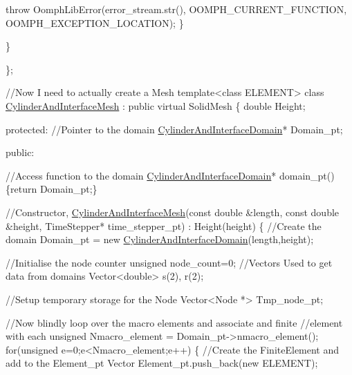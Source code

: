 \begin{DoxyCodeInclude}
      \textcolor{keywordflow}{throw} OomphLibError(error\_stream.str(),
                          OOMPH\_CURRENT\_FUNCTION,
                          OOMPH\_EXCEPTION\_LOCATION);
   \}

 \}

\};

\textcolor{comment}{//Now I need to actually create a Mesh}
\textcolor{keyword}{template}<\textcolor{keyword}{class} ELEMENT>
\textcolor{keyword}{class }\hyperlink{classCylinderAndInterfaceMesh}{CylinderAndInterfaceMesh} : \textcolor{keyword}{public} \textcolor{keyword}{virtual} SolidMesh
\{
 \textcolor{keywordtype}{double} Height;

\textcolor{keyword}{protected}:
 \textcolor{comment}{//Pointer to the domain}
 \hyperlink{classCylinderAndInterfaceDomain}{CylinderAndInterfaceDomain}* Domain\_pt;

\textcolor{keyword}{public}:

 \textcolor{comment}{//Access function to the domain}
 \hyperlink{classCylinderAndInterfaceDomain}{CylinderAndInterfaceDomain}* domain\_pt() \{\textcolor{keywordflow}{return} Domain\_pt;\}

 \textcolor{comment}{//Constructor, }
 \hyperlink{classCylinderAndInterfaceMesh}{CylinderAndInterfaceMesh}(\textcolor{keyword}{const} \textcolor{keywordtype}{double} &length, \textcolor{keyword}{const} \textcolor{keywordtype}{double} &height,
                            TimeStepper* time\_stepper\_pt) : Height(height)
  \{
   \textcolor{comment}{//Create the domain}
   Domain\_pt = \textcolor{keyword}{new} \hyperlink{classCylinderAndInterfaceDomain}{CylinderAndInterfaceDomain}(length,height);

   \textcolor{comment}{//Initialise the node counter}
   \textcolor{keywordtype}{unsigned} node\_count=0;
   \textcolor{comment}{//Vectors Used to get data from domains}
   Vector<double> s(2), r(2);
   
   \textcolor{comment}{//Setup temporary storage for the Node}
   Vector<Node *> Tmp\_node\_pt;

   \textcolor{comment}{//Now blindly loop over the macro elements and associate and finite}
   \textcolor{comment}{//element with each}
   \textcolor{keywordtype}{unsigned} Nmacro\_element = Domain\_pt->nmacro\_element();
   \textcolor{keywordflow}{for}(\textcolor{keywordtype}{unsigned} e=0;e<Nmacro\_element;e++)
    \{
     \textcolor{comment}{//Create the FiniteElement and add to the Element\_pt Vector}
     Element\_pt.push\_back(\textcolor{keyword}{new} ELEMENT);


\end{DoxyCodeInclude}
